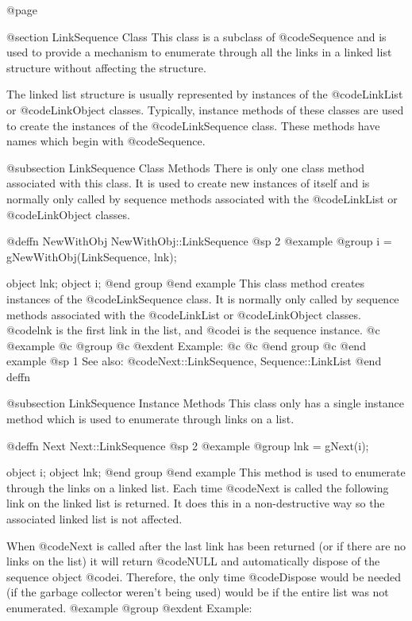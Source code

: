 @page

@section LinkSequence Class
This class is a subclass of @code{Sequence} and is used to provide a
mechanism to enumerate through all the links in a linked list structure
without affecting the structure.

The linked list structure is usually represented by instances of the
@code{LinkList} or @code{LinkObject} classes.  Typically, instance
methods of these classes are used to create the instances of the
@code{LinkSequence} class.  These methods have names which begin with
@code{Sequence}.



@subsection LinkSequence Class Methods
There is only one class method associated with this class.  It is used
to create new instances of itself and is normally only called by
sequence methods associated with the @code{LinkList} or @code{LinkObject}
classes.





@deffn {NewWithObj} NewWithObj::LinkSequence
@sp 2
@example
@group
i = gNewWithObj(LinkSequence, lnk);

object  lnk;
object  i;
@end group
@end example
This class method creates instances of the @code{LinkSequence} class.
It is normally only called by sequence methods associated with the
@code{LinkList} or @code{LinkObject} classes.  @code{lnk} is the first
link in the list, and @code{i} is the sequence instance.
@c @example
@c @group
@c @exdent Example:
@c 
@c @end group
@c @end example
@sp 1
See also:  @code{Next::LinkSequence, Sequence::LinkList}
@end deffn




@subsection LinkSequence Instance Methods
This class only has a single instance method which is used to enumerate
through links on a list.






@deffn {Next} Next::LinkSequence
@sp 2
@example
@group
lnk = gNext(i);

object  i;
object  lnk;
@end group
@end example
This method is used to enumerate through the links on a linked list.
Each time @code{Next} is called the following link on the linked list
is returned.  It does this in a non-destructive way so the associated
linked list is not affected.

When @code{Next} is called after the last link has been returned (or
if there are no links on the list) it will return @code{NULL} and
automatically dispose of the sequence object @code{i}.  Therefore,
the only time @code{Dispose} would be needed (if the garbage collector
weren't being used) would be if the entire list was not enumerated.
@example
@group
@exdent Example:

